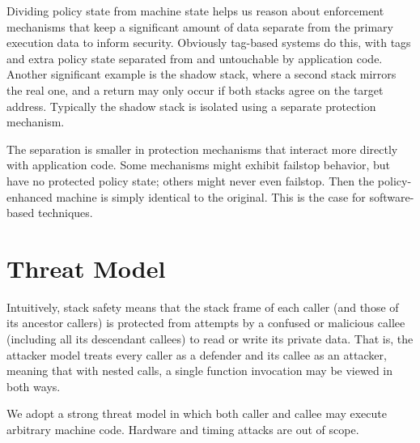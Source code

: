 \documentclass[acmsmall,review,anonymous]{acmart}\settopmatter{printfolios=true,printccs=false,printacmref=false}
\begin{document}
Dividing policy state from machine state helps us reason about
enforcement mechanisms that keep a significant amount of data separate from the
primary execution data to inform security. Obviously tag-based systems do this,
with tags and extra policy state separated from and untouchable by application code.
Another significant example is the shadow stack, where a second stack
mirrors the real one, and a return may only occur if both stacks agree on the
target address. Typically the shadow stack is isolated using a separate protection
mechanism.

The separation is smaller in protection mechanisms that interact more directly
with application code. Some mechanisms might exhibit failstop behavior, but have
no protected policy state; others might never even failstop. Then the policy-enhanced
machine is simply identical to the original. This is the case for software-based
techniques.

\section{Threat Model}
\label{sec:threat}


Intuitively, stack safety means that the stack frame of each caller (and
those of its ancestor callers) is protected
from attempts by a confused or malicious callee (including all its
descendant callees)
to read or write its private data.
That is, the attacker model treats every caller as a defender and its callee as
an attacker, meaning that with nested calls, a single function invocation
may be viewed in both ways.

We adopt a strong threat model in which both caller and callee may execute
arbitrary machine code. Hardware and timing attacks are out of scope.

\end{document}
